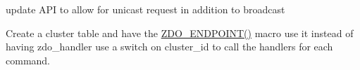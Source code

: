 \begin{DoxyRefList}
\item[\label{todo__todo000016}%
\hypertarget{todo__todo000016}{}%
Global \hyperlink{group__zcl__client_ga4c75937cc0fa5c70c63f30b59a4ddebc}{zdo\-\_\-send\-\_\-match\-\_\-desc} (\hyperlink{structwpan__dev__t}{wpan\-\_\-dev\-\_\-t} $\ast$dev, const uint16\-\_\-t $\ast$clusters, uint16\-\_\-t profile\-\_\-id, wpan\-\_\-response\-\_\-fn callback, const void F\-A\-R $\ast$context)]update A\-P\-I to allow for unicast request in addition to broadcast  
\item[\label{todo__todo000024}%
\hypertarget{todo__todo000024}{}%
File \hyperlink{zigbee__zdo_8c}{zigbee\-\_\-zdo.c} ]Create a cluster table and have the \hyperlink{group__zdo_gaef7118e478f5ad9949dcd23f6e0901c9}{Z\-D\-O\-\_\-\-E\-N\-D\-P\-O\-I\-N\-T()} macro use it instead of having zdo\-\_\-handler use a switch on cluster\-\_\-id to call the handlers for each command. 
\end{DoxyRefList}